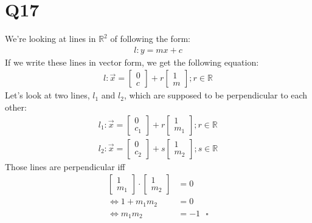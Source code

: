 \documentclass{article}
\begin{document}
\section*{Q17}
We're looking at lines in $\mathbb{R}^2$ of following the form:
\begin{align}
    l: y = mx + c
\end{align}
If we write these lines in vector form, we get the following equation:
\begin{align}
    l: \vec x =
    \begin{bmatrix}
        0\\
        c
    \end{bmatrix}
    + r \begin{bmatrix}
        1\\
        m
    \end{bmatrix};
    r \in \mathbb{R}
\end{align}
Let's look at two lines, $l_1$ and $l_2$, which are supposed to be perpendicular to each other:
\begin{align}
    l_1: \vec x =
    \begin{bmatrix}
        0\\
        c_1
    \end{bmatrix}
    + r \begin{bmatrix}
        1\\
        m_1
    \end{bmatrix};
    r \in \mathbb{R}\\
    l_2: \vec x =
    \begin{bmatrix}
        0\\
        c_2
    \end{bmatrix}
    + s \begin{bmatrix}
        1\\
        m_2
    \end{bmatrix};
    s \in \mathbb{R}   
\end{align}
Those lines are perpendicular iff
\begin{align}
    \begin{bmatrix}
        1\\m_1
    \end{bmatrix}
    \cdot \begin{bmatrix}
        1\\m_2
    \end{bmatrix}
    &= 0\\
    \Leftrightarrow 1+m_1m_2 &=0\\ \Leftrightarrow m_1m_2 &= -1\:\:\:\square
\end{align}
\end{document}
